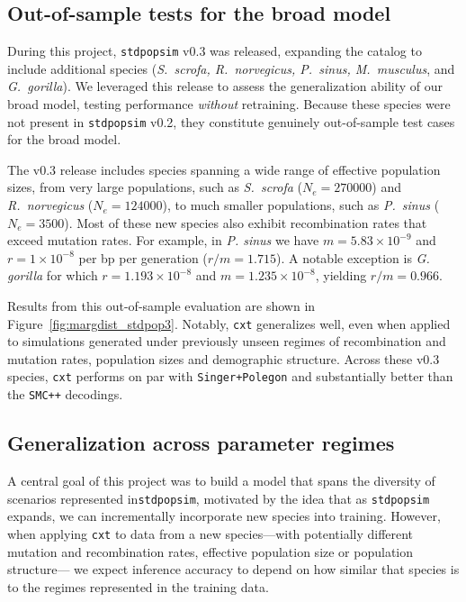 \documentclass{article}
\newcommand{\cxtkit}{\texttt{cxt}\xspace}
\newcommand{\stdpopsim}{\texttt{stdpopsim}\xspace}
\newcommand{\smcpp}{\texttt{SMC++}\xspace}
\begin{document}
\subsection*{Out-of-sample tests for the broad model}
During this project, \stdpopsim v0.3 was released, expanding the catalog to include additional species 
(\textit{S.~scrofa, R.~norvegicus, P.~sinus, M.~musculus}, and \textit{G.~gorilla}). 
We leveraged this release to assess the generalization ability of our broad model, testing performance \emph{without} retraining. 
Because these species were not present in \stdpopsim v0.2, they constitute genuinely out-of-sample test cases for the broad model.

The v0.3 release includes species spanning a wide range of effective population sizes, from very large populations, 
such as \emph{S.~scrofa} ($N_e = 270000$) and \emph{R.~norvegicus} ($N_e = 124000$), 
to much smaller populations, such as \emph{P.~sinus} ($N_e = 3500$). 
Most of these new species also exhibit recombination rates that exceed mutation rates.
For example, in  \emph{P. sinus} we have $m=5.83\times10^{-9}$ and $r=1\times10^{-8}$ per bp per generation ($r/m=1.715$).
A notable exception is \emph{G. gorilla} for which $r=1.193\times10^{-8}$ and $m=1.235\times10^{-8}$, yielding $r/m=0.966$.



Results from this out-of-sample evaluation are shown in Figure~\ref{fig:margdist_stdpop3}. 
Notably, \cxtkit generalizes well, even when applied to simulations generated under previously unseen regimes 
of recombination and mutation rates, population sizes and demographic structure.
Across these v0.3 species, \cxtkit performs on par with \texttt{Singer+Polegon} and substantially better than the \smcpp decodings. 


\subsection*{Generalization across parameter regimes}

A central goal of this project was to build a model that spans the diversity of scenarios represented in\stdpopsim, 
motivated by the idea that as \stdpopsim expands, we can incrementally incorporate new species into training. 
However, when applying \cxtkit to data from a new species---with potentially different mutation and recombination rates, effective population size or population structure---
we expect inference accuracy to depend on how similar that species is to the regimes represented in the training data.
\end{document}
